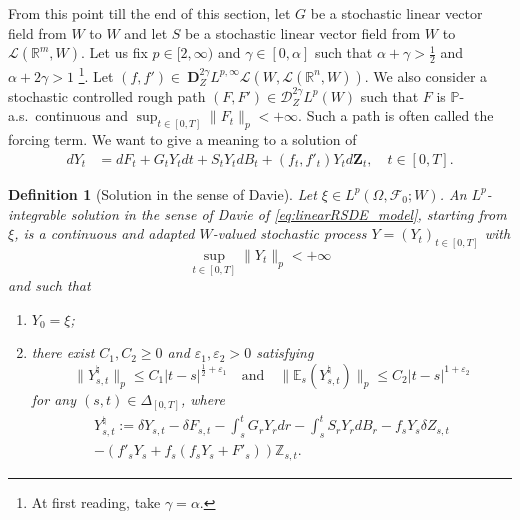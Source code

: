 \documentclass[11pt,a4paper]{article}
\newcommand{\R}{\mathbb{R}}
\newcommand{\E}{\mathbb{E}}
\newtheorem{defn}{Definition}[section]
\theoremstyle{plain}
\begin{document}
From this point till the end of this section, let $G$ be a stochastic linear vector field from $W$ to $W$ and let $S$ be a stochastic linear vector field from $W$ to $\mathscr{L}(\R^m,W)$. 
Let us fix $p \in [2,\infty)$ and $\gamma \in [0,\alpha]$ such that $\alpha + \gamma > \frac12$ and $\alpha + 2\gamma > 1$ \footnote{At first reading, take $\gamma = \alpha$.}. 
Let $(f,f') \in~\mathbf{D}^{2\gamma}_ZL^{p,\infty}\mathscr{L}(W,\mathscr{L}(\R^n,W))$. We also consider a stochastic controlled rough path $(F,F') \in \mathscr{D}^{2\gamma}_Z L^p(W)$ such that $F$ is $\mathbb{P}$-a.s.\ continuous and $\sup_{t \in [0,T]} \|F_t\|_p <+\infty$. Such a path is often called the forcing term.
We want to give a meaning to a solution of \begin{equation} \begin{aligned}
     dY_t &= dF_t +  G_tY_tdt + S_tY_tdB_t + (f_t,f'_t)Y_td\mathbf{Z}_t, \quad t \in [0,T] .
\end{aligned} \label{eq:linearRSDE_model}
\end{equation}

\begin{defn}[Solution in the sense of Davie] \label{def:solutionlinearRSDEs}
Let $\xi \in L^p(\Omega,\mathcal{F}_0;W)$.  An $L^p$-integrable solution in the sense of Davie of \eqref{eq:linearRSDE_model}, starting from $\xi$, is a continuous and adapted $W$-valued stochastic process $Y=(Y_t)_{t \in [0,T]}$ with \begin{equation*}
        \sup_{t \in [0,T]} \|Y_t\|_p<+\infty
    \end{equation*} 
    and such that 
    \begin{enumerate}
        \item[i)] $Y_0 = \xi$;
        \item[ii)] there exist $C_1,C_2\ge0$ and $\varepsilon_1,\varepsilon_2 >0$ satisfying \begin{equation*}
            \|Y_{s,t}^{\natural}\|_p \le C_1 |t-s|^{\frac{1}{2}+\varepsilon_1} \quad \text{and} \quad \|\E_s(Y_{s,t}^{\natural})\|_p \le C_2 |t-s|^{1+\varepsilon_2}
        \end{equation*} for any $(s,t) \in \Delta_{[0,T]}$, where \begin{multline*} \label{davieexpansion}
            Y_{s,t}^{\natural} :=  \delta Y_{s,t} - \delta F_{s,t} - \int_s^t G_rY_r dr - \int_s^t S_rY_rdB_r - f_sY_s\delta Z_{s,t} \\  -(f'_sY_s+f_s(f_sY_s+F'_s))\mathbb{Z}_{s,t}.   
\end{multline*}
    \end{enumerate}
\end{defn}
\end{document}
